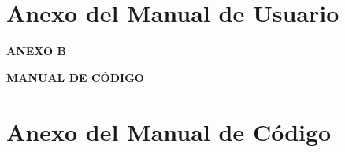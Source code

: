 \documentclass[a4paper, 12pt,oneside]{book}
\let\oldchapter\chapter
\renewcommand{\chapter}{%
  \oldchapter}
\begin{document}
\newpage
\chapter{Anexo del Manual de Usuario}

\clearpage

\thispagestyle{empty}
\begin{center}
\vspace*{7cm}
{\LARGE \textbf{ANEXO B}\par}
\vspace{0.5cm}
{\Large \textbf{MANUAL DE CÓDIGO}\par}
\end{center}
\clearpage

\newpage
\chapter{Anexo del Manual de Código}

\clearpage
\end{document}
